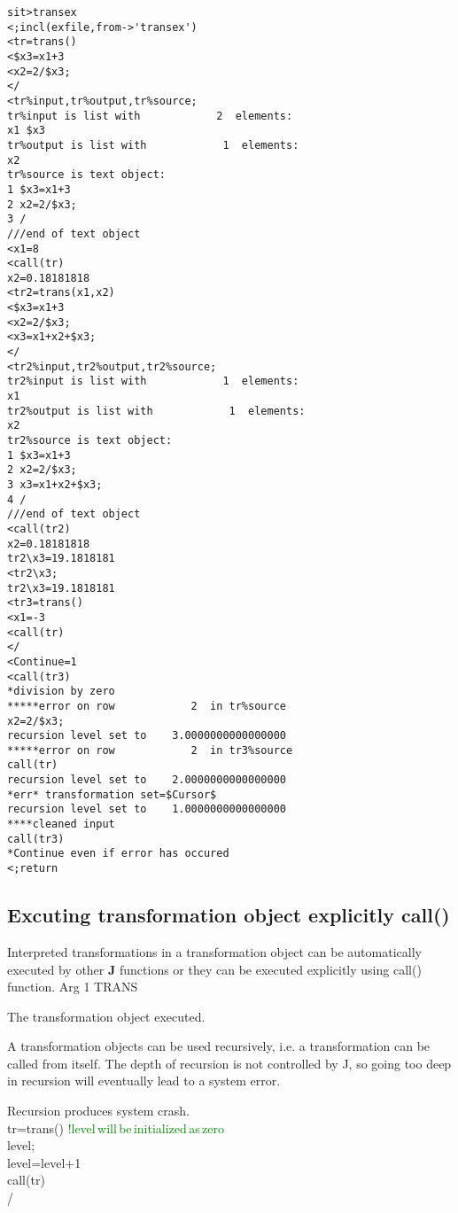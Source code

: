 \color{Green}
\begin{verbatim}
sit>transex
<;incl(exfile,from->'transex')
<tr=trans()
<$x3=x1+3
<x2=2/$x3;
</
<tr%input,tr%output,tr%source;
tr%input is list with            2  elements:
x1 $x3
tr%output is list with            1  elements:
x2
tr%source is text object:
1 $x3=x1+3
2 x2=2/$x3;
3 /
///end of text object
<x1=8
<call(tr)
x2=0.18181818
<tr2=trans(x1,x2)
<$x3=x1+3
<x2=2/$x3;
<x3=x1+x2+$x3;
</
<tr2%input,tr2%output,tr2%source;
tr2%input is list with            1  elements:
x1
tr2%output is list with            1  elements:
x2
tr2%source is text object:
1 $x3=x1+3
2 x2=2/$x3;
3 x3=x1+x2+$x3;
4 /
///end of text object
<call(tr2)
x2=0.18181818
tr2\x3=19.1818181
<tr2\x3;
tr2\x3=19.1818181
<tr3=trans()
<x1=-3
<call(tr)
</
<Continue=1
<call(tr3)
*division by zero
*****error on row            2  in tr%source
x2=2/$x3;
recursion level set to    3.0000000000000000
*****error on row            2  in tr3%source
call(tr)
recursion level set to    2.0000000000000000
*err* transformation set=$Cursor$
recursion level set to    1.0000000000000000
****cleaned input
call(tr3)
*Continue even if error has occured
<;return
\end{verbatim}
\color{Black}
\subsection{Excuting transformation object explicitly \textcolor{VioletRed}{call}()}
\label{call}
Interpreted transformations in a transformation object can be automatically executed by other \textbf{J}
functions or they can be executed explicitly using \textcolor{VioletRed}{call}() function.
\vspace{0.3cm}
\hline
\vspace{0.3cm}
\noindent Arg \tabto{3cm} 1 \tabto{5cm}  TRANS \tabto{7cm}
\begin{changemargin}{3cm}{0cm}
\noindent  The transformation object executed.
\end {changemargin}
\hline
\vspace{0.2cm}
\begin{note}
A transformation objects can be used recursively, i.e. a transformation can be called from
itself. The depth of recursion is not controlled by J, so going too deep in recursion will
eventually lead to a system error.
\end{note}
\begin{example}[recursion]Recursion produces system crash.\\
\label{recursion}
tr=\textcolor{VioletRed}{trans}() \textcolor{green}{!level\,will\,be\,initialized\,as\,zero}\\
level;\\
level=level+1\\
\textcolor{VioletRed}{call}(tr)\\
/
\end{example}
